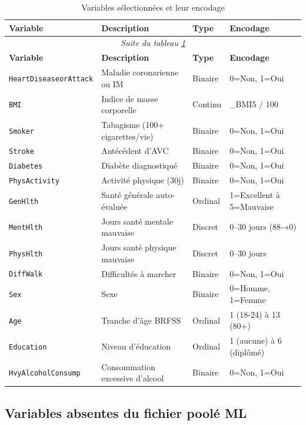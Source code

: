 \begin{longtable}{p{3.8cm}p{4cm}p{2cm}p{3.5cm}}
\caption{Variables sélectionnées et leur encodage}
\label{tab:variables}\\
\toprule
\textbf{Variable} & \textbf{Description} & \textbf{Type} & \textbf{Encodage} \\
\midrule
\endfirsthead
\multicolumn{4}{c}{\textit{Suite du tableau \ref{tab:variables}}}\\
\toprule
\textbf{Variable} & \textbf{Description} & \textbf{Type} & \textbf{Encodage} \\
\midrule
\endhead
\bottomrule
\endlastfoot
\texttt{HeartDiseaseorAttack} & Maladie coronarienne ou IM & Binaire & 0=Non, 1=Oui \\
\texttt{BMI} & Indice de masse corporelle & Continu & \_BMI5 / 100 \\
\texttt{Smoker} & Tabagisme (100+ cigarettes/vie) & Binaire & 0=Non, 1=Oui \\
\texttt{Stroke} & Antécédent d'AVC & Binaire & 0=Non, 1=Oui \\
\texttt{Diabetes} & Diabète diagnostiqué & Binaire & 0=Non, 1=Oui \\
\texttt{PhysActivity} & Activité physique (30j) & Binaire & 0=Non, 1=Oui \\
\texttt{GenHlth} & Santé générale auto-évaluée & Ordinal & 1=Excellent à 5=Mauvaise \\
\texttt{MentHlth} & Jours santé mentale mauvaise & Discret & 0--30 jours (88→0) \\
\texttt{PhysHlth} & Jours santé physique mauvaise & Discret & 0--30 jours \\
\texttt{DiffWalk} & Difficultés à marcher & Binaire & 0=Non, 1=Oui \\
\texttt{Sex} & Sexe & Binaire & 0=Homme, 1=Femme \\
\texttt{Age} & Tranche d'âge BRFSS & Ordinal & 1 (18-24) à 13 (80+) \\
\texttt{Education} & Niveau d'éducation & Ordinal & 1 (aucune) à 6 (diplômé) \\
\texttt{HvyAlcoholConsump} & Consommation excessive d'alcool & Binaire & 0=Non, 1=Oui \\
\bottomrule
\end{longtable}

\subsection{Variables absentes du fichier poolé ML}

